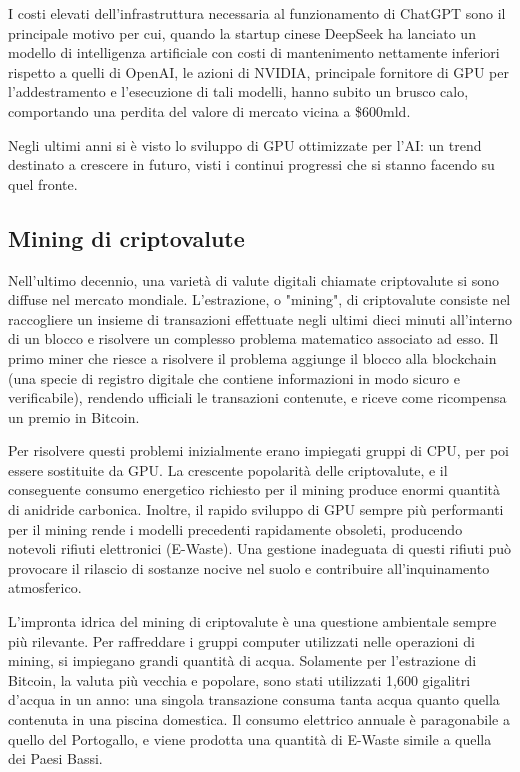 \documentclass[12pt,a4paper,oneside]{book}
\begin{document}
I costi elevati dell'infrastruttura necessaria al funzionamento di ChatGPT sono il principale motivo per cui, quando la startup cinese DeepSeek ha lanciato un modello di intelligenza artificiale con costi di mantenimento nettamente inferiori rispetto a quelli di OpenAI, le azioni di NVIDIA, principale fornitore di GPU per l'addestramento e l'esecuzione di tali modelli,  hanno subito un brusco calo, comportando una perdita del valore di mercato vicina a \$600mld.

Negli ultimi anni si è visto lo sviluppo di GPU ottimizzate per l'AI: un trend destinato a crescere in futuro, visti i continui progressi che si stanno facendo su quel fronte.

\subsection{Mining di criptovalute}

Nell'ultimo decennio, una varietà di valute digitali chiamate criptovalute si sono diffuse nel mercato mondiale. L'estrazione, o "mining", di criptovalute consiste nel raccogliere un insieme di transazioni effettuate negli ultimi dieci minuti all'interno di un blocco e risolvere un complesso problema matematico associato ad esso. Il primo miner che riesce a risolvere il problema aggiunge il blocco alla blockchain (una specie di registro digitale che contiene informazioni in modo sicuro e verificabile), rendendo ufficiali le transazioni contenute, e riceve come ricompensa un premio in Bitcoin.

Per risolvere questi problemi inizialmente erano impiegati gruppi di CPU, per poi essere sostituite da GPU. La crescente popolarità delle criptovalute, e il conseguente consumo energetico richiesto per il mining produce enormi quantità di anidride carbonica. Inoltre, il rapido sviluppo di GPU sempre più performanti per il mining rende i modelli precedenti rapidamente obsoleti, producendo notevoli rifiuti elettronici (E-Waste). Una gestione inadeguata di questi rifiuti può provocare il rilascio di sostanze nocive nel suolo e contribuire all'inquinamento atmosferico.

L'impronta idrica del mining di criptovalute è una questione ambientale sempre più rilevante. Per raffreddare i gruppi computer utilizzati nelle operazioni di mining, si impiegano grandi quantità di acqua. Solamente per l'estrazione di Bitcoin, la valuta più vecchia e popolare, sono stati utilizzati 1,600 gigalitri d'acqua in un anno: una singola transazione consuma tanta acqua quanto quella contenuta in una piscina domestica. Il consumo elettrico annuale è paragonabile a quello del Portogallo, e viene prodotta una quantità di E-Waste simile a quella dei Paesi Bassi.
\end{document}
